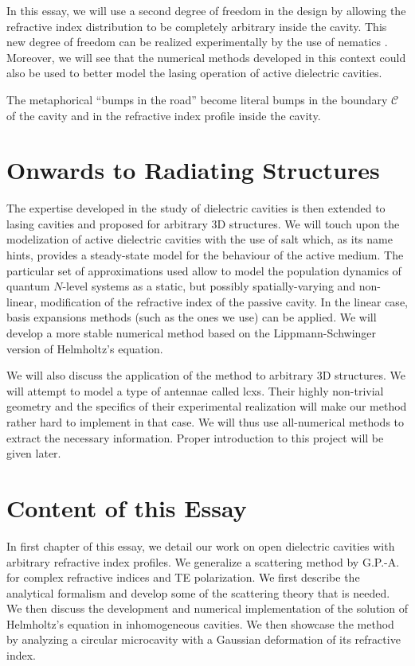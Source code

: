 In this essay, we will use a second degree of freedom in the design
by allowing the refractive index distribution to be completely
arbitrary inside the cavity. This new degree of freedom can be realized
experimentally by the use of nematics \cite{PTA2013}. 
Moreover, we will see that the numerical
methods developed in this context could also be used to better model the lasing 
operation of active dielectric cavities. 

The metaphorical ``bumps in the road'' become literal bumps in the 
boundary $\mathcal{C}$ of the cavity and in the refractive index
profile inside the cavity.


\section{Onwards to Radiating Structures}
The expertise developed in the study of dielectric cavities is then
extended to lasing cavities and proposed for arbitrary
3D structures. We will touch upon the modelization of active
dielectric cavities with the use of \gls{salt} which, as its name
hints, provides a steady-state model for the behaviour of the 
active medium. The particular set of approximations used 
allow to model the population dynamics of quantum $N$-level
systems as a static, but possibly spatially-varying and non-linear, 
modification of the refractive index of the passive cavity. 
In the linear case, basis expansions methods (such as the ones
we use) can be applied. We will develop a more stable numerical method
based on the Lippmann-Schwinger version of Helmholtz's equation.

We will also discuss the application of the method to arbitrary 
3D structures. We will attempt to model a type of antennae 
called \glspl{lcx}. Their highly non-trivial geometry and the specifics
of their experimental realization will make our method rather hard 
to implement in that case. We will thus use all-numerical methods 
to extract the necessary information. Proper introduction to this project
will be given later.

\section{Content of this Essay}

In first chapter of this essay, we detail our work on open
dielectric cavities with arbitrary refractive index profiles. 
We generalize a scattering method by G.P.-A. \cite{GAP2013a} for 
complex refractive indices and TE polarization. We first describe
the analytical formalism and develop some of the scattering theory 
that is needed. We then discuss the development and numerical implementation
of the solution of Helmholtz's equation in inhomogeneous cavities. 
We then showcase the method by analyzing a circular microcavity with a 
Gaussian deformation of its refractive index. 


